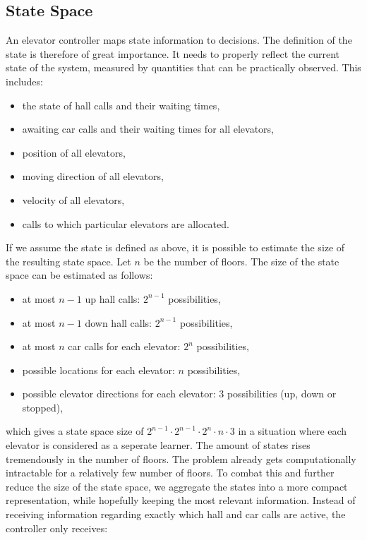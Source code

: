 \subsection{State Space}

An elevator controller maps state information to decisions. The definition of the state is therefore of great importance. It needs to properly reflect the current state of the system, measured by quantities that can be practically observed. This includes:

\begin{itemize}
    \item the state of hall calls and their waiting times,
    \item awaiting car calls and their waiting times for all elevators,
    \item position of all elevators,
    \item moving direction of all elevators,
    \item velocity of all elevators,
    \item calls to which particular elevators are allocated.
\end{itemize}

If we assume the state is defined as above, it is possible to estimate the size of the resulting state space. Let $n$ be the number of floors. The size of the state space can be estimated as follows:

\begin{itemize}
    \item at most $n - 1$ up hall calls: $2^{n-1}$ possibilities,
    \item at most $n - 1$ down hall calls: $2^{n-1}$ possibilities,
    \item at most $n$ car calls for each elevator: $2^{n}$ possibilities,
    \item possible locations for each elevator: $n$ possibilities,
    \item possible elevator directions for each elevator: $3$ possibilities (up, down or stopped),
\end{itemize}

which gives a state space size of $2^{n - 1} \cdot 2^{n - 1} \cdot 2^{n} \cdot n \cdot 3$ in a situation where each elevator is considered as a seperate learner. The amount of states rises tremendously in the number of floors. The problem already gets computationally intractable for a relatively few number of floors. To combat this and further reduce the size of the state space, we aggregate the states into a more compact representation, while hopefully keeping the most relevant information. Instead of receiving information regarding exactly which hall and car calls are active, the controller only receives: 

